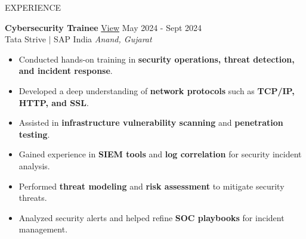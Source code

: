 \documentclass{resume} %
\begin{document}
\begin{rSection}{EXPERIENCE}

\textbf{Cybersecurity Trainee} \href{https://bit.ly/basakstrive}{View} \hfill May 2024 - Sept 2024\\
Tata Strive $|$ SAP India \hfill \textit{Anand, Gujarat}
 \begin{itemize}
    \item Conducted hands-on training in \textbf{security operations, threat detection, and incident response}.
    \item Developed a deep understanding of \textbf{network protocols} such as \textbf{TCP/IP, HTTP, and SSL}.
    \item Assisted in \textbf{infrastructure vulnerability scanning} and \textbf{penetration testing}.
    \item Gained experience in \textbf{SIEM tools} and \textbf{log correlation} for security incident analysis.
    \item Performed \textbf{threat modeling} and \textbf{risk assessment} to mitigate security threats.
    \item Analyzed security alerts and helped refine \textbf{SOC playbooks} for incident management.

\end{itemize}
\end{rSection}
\end{document}
